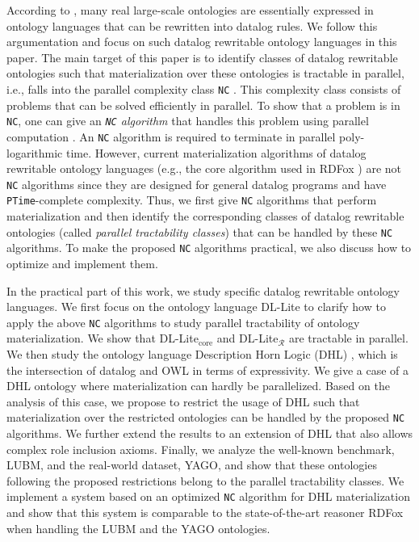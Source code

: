 According to \citet{MotikNPHO14}, many real large-scale ontologies are essentially expressed in ontology languages
that can be rewritten into datalog rules. We follow this argumentation and focus on such datalog rewritable ontology languages in this paper.
The main target of this paper is to identify classes of datalog rewritable ontologies such that materialization
over these ontologies is tractable in parallel, i.e., falls into the parallel complexity class \texttt{NC} \cite{Raymond95}.
This complexity class consists of problems that can be solved efficiently in parallel.
To show that a problem is in \texttt{NC}, one can give an \emph{\texttt{NC} algorithm} that handles this problem
using parallel computation \cite{Raymond95}.
An \texttt{NC} algorithm is required to terminate in parallel poly-logarithmic time.
However, current materialization algorithms of datalog rewritable ontology languages
(e.g., the core algorithm used in RDFox \cite{MotikNPHO14}) are not \texttt{NC} algorithms
since they are designed for general datalog programs and have \texttt{PTime}-complete complexity.
Thus, we first give \texttt{NC} algorithms that perform materialization
and then identify the corresponding classes of datalog rewritable ontologies (called \emph{parallel tractability classes})
that can be handled by these \texttt{NC} algorithms. To make the proposed \texttt{NC} algorithms practical,
we also discuss how to optimize and implement them.

In the practical part of this work, we study specific datalog rewritable ontology languages.
We first focus on the ontology language DL-Lite \cite{CalvaneseGLLR07} to clarify how to apply the above \texttt{NC} algorithms
to study parallel tractability of ontology materialization.
We show that DL-Lite$_{\text{core}}$ and DL-Lite$_\mathcal{R}$ are tractable in parallel.
We then study the ontology language Description Horn Logic (DHL) \cite{GrosofHVD03}, which is the intersection of datalog and OWL
in terms of expressivity. We give a case of a DHL ontology where materialization can hardly be parallelized.
Based on the analysis of this case, we propose to restrict the usage of DHL such that materialization over the
restricted ontologies can be handled by the proposed \texttt{NC} algorithms.
We further extend the results to an extension of DHL that also allows complex role inclusion axioms.
Finally, we analyze the well-known benchmark, LUBM, and the real-world dataset, YAGO, and 
show that these ontologies following the
proposed restrictions belong to the parallel tractability classes.
We implement a system based on an optimized \texttt{NC} algorithm for DHL materialization
and show that this system is comparable to the state-of-the-art reasoner RDFox
when handling the LUBM and the YAGO ontologies.

